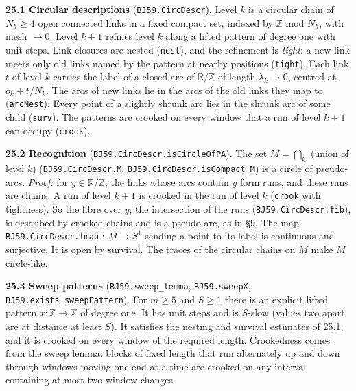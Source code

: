 \documentclass[11pt]{article}
\newcommand{\lean}[1]{\texttt{#1}}
\begin{document}
\textbf{25.1 Circular descriptions} (\lean{BJ59.\hspace{0pt}CircDescr}). Level $k$ is a circular chain of $N_k \geq 4$ open connected links in a fixed compact set, indexed by $\mathbb{Z}$ mod $N_k$, with mesh $\to 0$. Level $k + 1$ refines level $k$ along a lifted pattern of degree one with unit steps. Link closures are nested (\lean{nest}), and the refinement is \emph{tight}: a new link meets only old links named by the pattern at nearby positions (\lean{tight}). Each link $t$ of level $k$ carries the label of a closed arc of $\mathbb{R} /\mathbb{Z}$ of length $\lambda_k \to 0$, centred at $o_k + t/N_k$. The arcs of new links lie in the arcs of the old links they map to (\lean{arcNest}). Every point of a slightly shrunk arc lies in the shrunk arc of some child (\lean{surv}). The patterns are crooked on every window that a run of level $k + 1$ can occupy (\lean{crook}).

\textbf{25.2 Recognition} (\lean{BJ59.\hspace{0pt}CircDescr.\hspace{0pt}isCircleOfPA}). The set $M = \bigcap_k$ (union of level $k$) (\lean{BJ59.\hspace{0pt}CircDescr.\hspace{0pt}M}, \lean{BJ59.\hspace{0pt}CircDescr.\hspace{0pt}isCompact\_\hspace{0pt}M}) is a circle of pseudo-arcs. \emph{Proof:} for $y \in \mathbb{R} /\mathbb{Z}$, the links whose arcs contain $y$ form runs, and these runs are chains. A run of level $k + 1$ is crooked in the run of level $k$ (\lean{crook} with tightness). So the fibre over $y$, the intersection of the runs (\lean{BJ59.\hspace{0pt}CircDescr.\hspace{0pt}fib}), is described by crooked chains and is a pseudo-arc, as in \S{}9. The map \lean{BJ59.\hspace{0pt}CircDescr.\hspace{0pt}fmap} : $M \to S^1$ sending a point to its label is continuous and surjective. It is open by survival. The traces of the circular chains on $M$ make $M$ circle-like.

\textbf{25.3 Sweep patterns} (\lean{BJ59.\hspace{0pt}sweep\_\hspace{0pt}lemma}, \lean{BJ59.\hspace{0pt}sweepX}, \lean{BJ59.\hspace{0pt}exists\_\hspace{0pt}sweepPattern}). For $m \geq 5$ and $S \geq 1$ there is an explicit lifted pattern $x : \mathbb{Z} \to \mathbb{Z}$ of degree one. It has unit steps and is $S$-slow (values two apart are at distance at least $S$). It satisfies the nesting and survival estimates of 25.1, and it is crooked on every window of the required length. Crookedness comes from the sweep lemma: blocks of fixed length that run alternately up and down through windows moving one end at a time are crooked on any interval containing at most two window changes.
\end{document}
